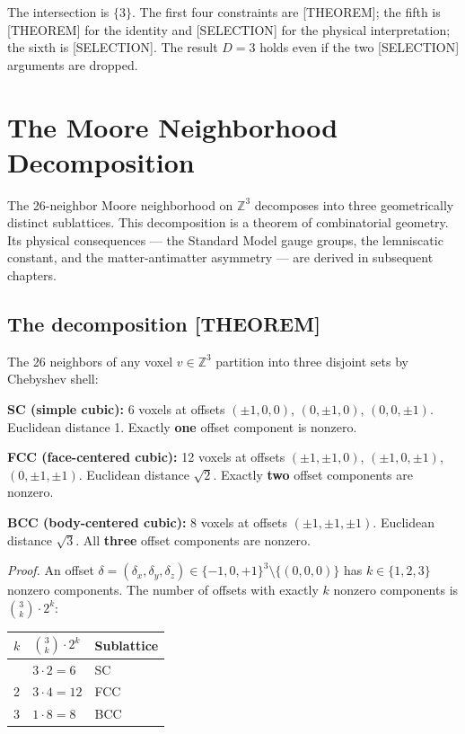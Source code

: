 \documentclass[
  11pt,
  letterpaper,
  twoside,
  openany]{book}
\makeatletter
\let\orig@section\section
\renewcommand{\section}{\needspace{8\baselineskip}\orig@section}
\makeatother
\begin{document}
The intersection is \(\{3\}\). The first four constraints are
{[}THEOREM{]}; the fifth is {[}THEOREM{]} for the identity and
{[}SELECTION{]} for the physical interpretation; the sixth is
{[}SELECTION{]}. The result \(D = 3\) holds even if the two
{[}SELECTION{]} arguments are dropped.

\chapter{The Moore Neighborhood Decomposition}\label{sec-moore}

The 26-neighbor Moore neighborhood on \(\mathbb{Z}^3\) decomposes into
three geometrically distinct sublattices. This decomposition is a
theorem of combinatorial geometry. Its physical consequences --- the
Standard Model gauge groups, the lemniscatic constant, and the
matter-antimatter asymmetry --- are derived in subsequent chapters.

\section{The decomposition
{[}THEOREM{]}}\label{the-decomposition-theorem}

\begin{ftdtheorem}

The 26 neighbors of any voxel \(v \in \mathbb{Z}^3\) partition into
three disjoint sets by Chebyshev shell:

\textbf{SC (simple cubic):} 6 voxels at offsets \((\pm 1, 0, 0)\),
\((0, \pm 1, 0)\), \((0, 0, \pm 1)\). Euclidean distance 1. Exactly
\textbf{one} offset component is nonzero.

\textbf{FCC (face-centered cubic):} 12 voxels at offsets
\((\pm 1, \pm 1, 0)\), \((\pm 1, 0, \pm 1)\), \((0, \pm 1, \pm 1)\).
Euclidean distance \(\sqrt{2}\). Exactly \textbf{two} offset components
are nonzero.

\textbf{BCC (body-centered cubic):} 8 voxels at offsets
\((\pm 1, \pm 1, \pm 1)\). Euclidean distance \(\sqrt{3}\). All
\textbf{three} offset components are nonzero.

\end{ftdtheorem}

\emph{Proof.} An offset
\(\delta = (\delta_x, \delta_y, \delta_z) \in \{-1, 0, +1\}^3 \setminus \{(0,0,0)\}\)
has \(k \in \{1, 2, 3\}\) nonzero components. The number of offsets with
exactly \(k\) nonzero components is \(\binom{3}{k} \cdot 2^k\):

\begin{longtable}[]{@{}lll@{}}
\toprule\noalign{}
\(k\) & \(\binom{3}{k} \cdot 2^k\) & Sublattice \\
\midrule\noalign{}
\endhead
\bottomrule\noalign{}
\endlastfoot
1 & \(3 \cdot 2 = 6\) & SC \\
2 & \(3 \cdot 4 = 12\) & FCC \\
3 & \(1 \cdot 8 = 8\) & BCC \\
\end{longtable}
\end{document}
